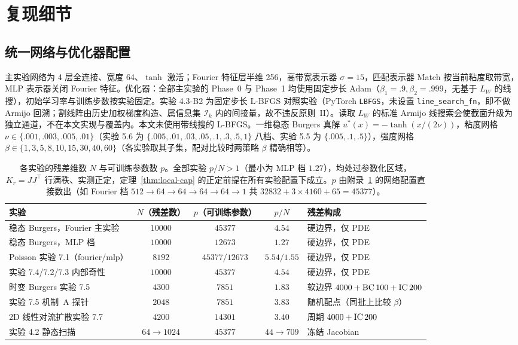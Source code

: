 \documentclass[fontset=windows,11pt]{ctexart}
\newcommand{\W}{W}
\numberwithin{equation}{section}
\begin{document}
\FloatBarrier
\section{复现细节}\label{app:repro}
\subsection{统一网络与优化器配置}
主实验网络为 4 层全连接、宽度 64、$\tanh$ 激活；Fourier 特征层半维 256，高带宽表示器 $\sigma=15$，匹配表示器 Match 按当前粘度取带宽，MLP 表示器关闭 Fourier 特征。优化器：全部主实验的 Phase~0 与 Phase~1 均使用固定步长 Adam（$\beta_1=.9,\beta_2=.999$，无基于 $L_\W$ 的线搜），初始学习率与训练步数按实验固定。实验 4.3-B2 为固定步长 L-BFGS 对照实验（PyTorch \texttt{LBFGS}，未设置 \texttt{line\_search\_fn}，即不做 Armijo 回溯；割线阵由历史加权梯度构造、属信息集 $\mathcal I_k$ 内的间接量，故不违反原则~II）。读取 $L_\W$ 的标准 Armijo 线搜索会使截面升级为独立通道，不在本文实现与覆盖内。本文未使用带线搜的 L-BFGS。一维稳态 Burgers 真解 $u^*(x)=-\tanh(x/(2\nu))$，粘度网格 $\nu\in\{.001,.003,.005,.01\}$（实验 5.6 为 $\{.005,.01,.03,.05,.1,.3,.5,1\}$ 八档、实验 5.5 为 $\{.005,.1,.5\}$），强度网格 $\beta\in\{1,3,5,8,10,15,30,40,60\}$（各实验取其子集，配对比较时两策略 $\beta$ 精确相等）。

\begin{table}[ht]\centering\small\renewcommand{\arraystretch}{1.2}\setlength{\tabcolsep}{4pt}
\begin{tabular}{p{3.4cm}cccp{3.4cm}}
\toprule
实验 & $N$（残差数） & $p$（可训练参数） & $p/N$ & 残差构成\\
\midrule
稳态 Burgers，Fourier 主实验 & $10000$ & $45377$ & $4.54$ & 硬边界，仅 PDE\\
稳态 Burgers，MLP 档 & $10000$ & $12673$ & $1.27$ & 硬边界，仅 PDE\\
Poisson 实验 7.1（fourier/mlp） & $8192$ & $45377/12673$ & $5.54/1.55$ & 硬边界，仅 PDE\\
实验 7.4/7.2/7.3 内部奇性 & $10000$ & $45377$ & $4.54$ & 硬边界，仅 PDE\\
时变 Burgers 实验 7.5 & $4300$ & $7851$ & $1.83$ & 软边界 $4000+{\rm BC}\,100+{\rm IC}\,200$\\
实验 7.5 机制~A 探针 & $2048$ & $7851$ & $3.83$ & 随机配点（同批上比较 $\beta$）\\
2D 线性对流扩散实验 7.7 & $4200$ & $14301$ & $3.40$ & 周期 $4000+{\rm IC}\,200$\\
实验 4.2 静态扫描 & $64\to1024$ & $45377$ & $44\to709$ & 冻结 Jacobian\\
\bottomrule
\end{tabular}
\caption{各实验的残差维数 $N$ 与可训练参数数 $p$。全部实验 $p/N>1$（最小为 MLP 档 $1.27$），均处过参数化区域，$K_r=JJ^\top$ 行满秩、实测正定，定理~\ref{thm:local-cap} 的正定前提在所有实验配置下成立。$p$ 由附录~\ref{app:repro} 的网络配置直接数出（如 Fourier 档 $512\to64\to64\to64\to64\to1$ 共 $32832+3\times4160+65=45377$）。}\label{tab:np}
\end{table}
\end{document}
